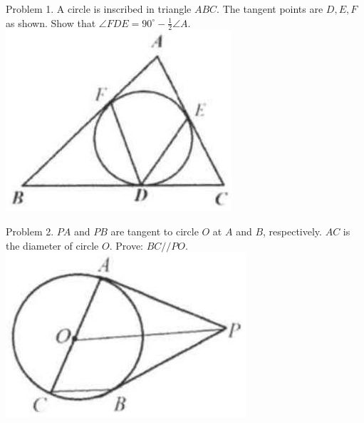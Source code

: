 \documentclass[10pt]{article}
\begin{document}
Problem 1. A circle is inscribed in triangle \(A B C\). The tangent points are \(D, E, F\) as shown. Show that \(\angle F D E=90^{\circ}-\frac{1}{2} \angle A\).\\
\includegraphics[max width=\textwidth, center]{2025_04_17_97bc1f7e44d93c271a88g-169(2)}

Problem 2. \(P A\) and \(P B\) are tangent to circle \(O\) at \(A\) and \(B\), respectively. \(A C\) is the diameter of circle \(O\). Prove: \(B C / / P O\).\\
\includegraphics[max width=\textwidth, center]{2025_04_17_97bc1f7e44d93c271a88g-169(4)}
\end{document}
